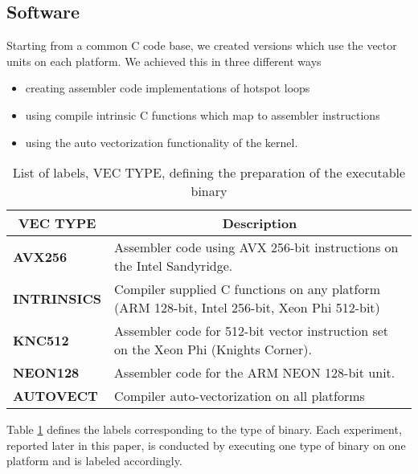 \subsection{Software}
Starting from a common C code base, we created versions which use the 
vector units on each platform. We achieved this in three different 
ways
\begin{itemize} 
   \item creating assembler code implementations of hotspot loops
   \item using compile intrinsic C functions which map to assembler
         instructions
   \item using the auto vectorization functionality of the kernel.  
\end{itemize}   
\begin{table}[tbhp]   
  \footnotesize
  \centering
  \caption{List of labels, VEC TYPE, defining the preparation of the executable binary}
  \begin{tabular}{ll} 
     \toprule
       \multicolumn{1}{c}{\bf VEC TYPE} & \multicolumn{1}{c}{\bf Description}        \\
     \midrule 
       \textbf{AVX256}     & Assembler code using AVX 256-bit instructions on the Intel Sandyridge. \\       
      \midrule       
       \textbf{INTRINSICS} & Compiler supplied C functions on any platform (ARM 128-bit, Intel 256-bit, Xeon Phi 512-bit) \\    
      \midrule       
       \textbf{KNC512}     & Assembler code for 512-bit vector instruction set on the Xeon Phi (Knights Corner). \\ 
      \midrule       
       \textbf{NEON128}    & Assembler code for the ARM NEON 128-bit unit. \\ 
      \midrule
       \textbf{AUTOVECT}   & Compiler auto-vectorization on all platforms \\
     \bottomrule
  \end{tabular}
   \label{tab:binary_labels_table} 
\end{table}  
Table \ref{tab:binary_labels_table} defines the labels corresponding to the 
type of binary. Each experiment, reported later in this paper, is conducted
by executing one type of binary on one platform and is labeled accordingly.
